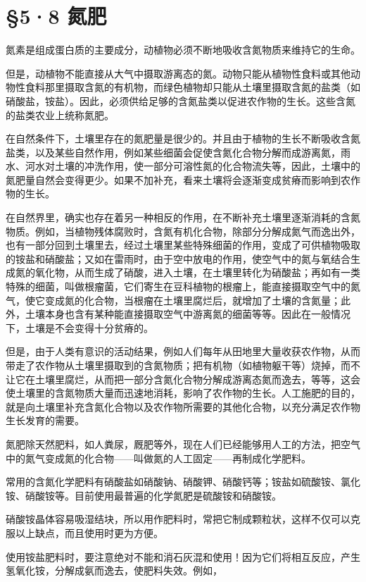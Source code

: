 \section{§5·8 氮肥}

氮素是组成蛋白质的主要成分，动植物必须不断地吸收含氮物质来维持它的生命。

但是，动植物不能直接从大气中摄取游离态的氮。动物只能从植物性食料或其他动物性食料那里摄取含氮的有机物，而绿色植物却只能从土壤里摄取含氮的盐类（如硝酸盐，铵盐）。因此，必须供给足够的含氮盐类以促进农作物的生长。这些含氮的盐类农业上统称氮肥。

在自然条件下，土壤里存在的氮肥量是很少的。并且由于植物的生长不断吸收含氮盐类，以及某些自然作用，例如某些细菌会促使含氮化合物分解而成游离氮，雨水、河水对土壤的冲洗作用，使一部分可溶性氮的化合物流失等，因此，土壤中的氮肥量自然会变得更少。如果不加补充，看来土壤将会逐渐变成贫瘠而影响到农作物的生长。

在自然界里，确实也存在着另一种相反的作用，在不断补充土壤里逐渐消耗的含氮物质。例如，当植物残体腐败时，含氮有机化合物，除部分分解成氮气而逸出外，也有一部分回到土壤里去，经过土壤里某些特殊细菌的作用，变成了可供植物吸取的铵盐和硝酸盐；又如在雷雨时，由于空中放电的作用，使空气中的氮与氧结合生成氮的氧化物，从而生成了硝酸，进入土壤，在土壤里转化为硝酸盐；再如有一类特殊的细菌，叫做根瘤菌，它们寄生在豆科植物的根瘤上，能直接摄取空气中的氮气，使它变成氮的化合物，当根瘤在土壤里腐烂后，就增加了土壤的含氮量；此外，土壤本身也含有某种能直接摄取空气中游离氮的细菌等等。因此在一般情况下，土壤是不会变得十分贫瘠的。

但是，由于人类有意识的活动结果，例如人们每年从田地里大量收获农作物，从而带走了农作物从土壤里摄取到的含氮物质；把有机物（如植物躯干等）烧掉，而不让它在土壤里腐烂，从而把一部分含氮化合物分解成游离态氮而逸去，等等，这会使土壤里的含氮物质大量而迅速地消耗，影响了农作物的生长。人工施肥的目的，就是向土壤里补充含氮化合物以及农作物所需要的其他化合物，以充分满足农作物生长发育的需要。

氮肥除天然肥料，如人粪尿，厩肥等外，现在人们已经能够用人工的方法，把空气中的氮气变成氮的化合物------叫做氮的人工固定------再制成化学肥料。

常用的含氮化学肥料有硝酸盐如硝酸钠、硝酸钾、硝酸钙等；铵盐如硫酸铵、氯化铵、硝酸铵等。目前使用最普遍的化学氮肥是硫酸铵和硝酸铵。

硝酸铵晶体容易吸湿结块，所以用作肥料时，常把它制成颗粒状，这样不仅可以克服以上缺点，而且使用时更为方便。

使用铵盐肥料时，要注意绝对不能和消石灰混和使用！因为它们将相互反应，产生氢氧化铵，分解成氨而逸去，使肥料失效。例如，


